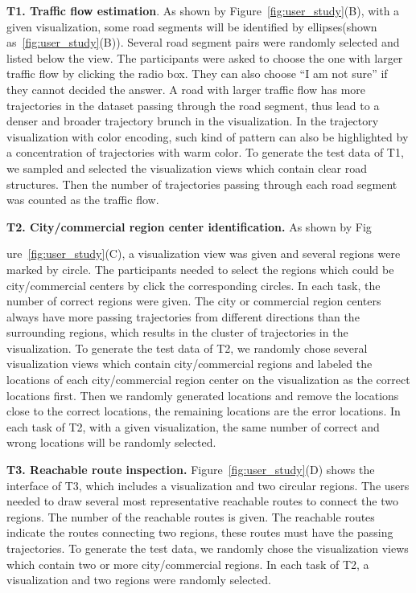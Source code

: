 \textbf{T1. Traffic flow estimation}. 
As shown by Figure~\ref{fig:user_study}(B), with a given visualization, some road segments will be identified by ellipses(shown as~\ref{fig:user_study}(B)). Several road segment pairs were randomly selected and listed below the view. The participants were asked to choose the one with larger traffic flow by clicking the radio box. They can also choose ``I am not sure'' if they cannot decided the answer. 
A road with larger traffic flow has more trajectories in the dataset passing through the road segment, thus lead to a denser and broader trajectory brunch in the visualization. In the trajectory visualization with color encoding, such kind of pattern can also be highlighted by a concentration of trajectories with warm color. 
To generate the test data of T1,  we sampled and selected the visualization views which contain clear road structures. Then the number of trajectories passing through each road segment was counted as the traffic flow. 

\textbf{T2. City/commercial region center identification.} 
As shown by Fig

ure~\ref{fig:user_study}(C), a visualization view was given and several regions were marked by circle. The participants needed to select the regions which could be city/commercial centers by click the corresponding circles. In each task, the number of correct regions were given. 
The city or commercial region centers always have more passing trajectories from different directions than the surrounding regions, which results in the  cluster of trajectories in the visualization. 
To generate the test data of T2, we randomly chose several visualization views which contain city/commercial regions and labeled the locations of each city/commercial region center on the visualization as the correct locations first.  Then we randomly generated locations and remove the locations close to the correct locations, the remaining locations are the error locations. In each task of T2, with a given visualization, the same number of correct and wrong locations will be randomly selected. 

\textbf{T3. Reachable route inspection.} 
Figure~\ref{fig:user_study}(D) shows the interface of T3, which includes a visualization and two circular regions. The users needed to draw several most representative reachable routes to connect the two regions. The number of the reachable routes is given. 
The reachable routes indicate the routes connecting two regions, these routes must have the passing trajectories. 
To generate the test data, we randomly chose the visualization views which contain two or more city/commercial regions. In each task of T2, a visualization and two regions were randomly selected.


